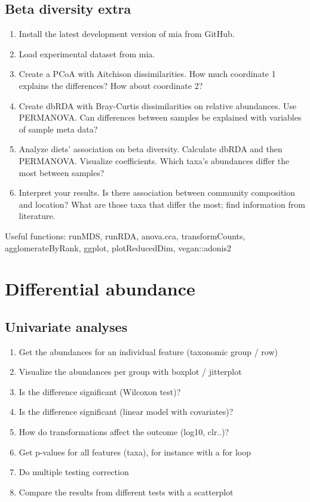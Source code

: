 \documentclass[
]{book}
\providecommand{\tightlist}{%
  \setlength{\itemsep}{0pt}\setlength{\parskip}{0pt}}
\begin{document}
\hypertarget{beta-diversity-extra}{%
\subsection{Beta diversity extra}\label{beta-diversity-extra}}

\begin{enumerate}
\def\labelenumi{\arabic{enumi}.}
\tightlist
\item
  Install the latest development version of mia from GitHub.
\item
  Load experimental dataset from mia.
\item
  Create a PCoA with Aitchison dissimilarities. How much coordinate 1 explains the differences? How about coordinate 2?
\item
  Create dbRDA with Bray-Curtis dissimilarities on relative abundances. Use PERMANOVA. Can differences between samples be explained with variables of sample meta data?
\item
  Analyze diets' association on beta diversity. Calculate dbRDA and then PERMANOVA. Visualize coefficients. Which taxa's abundances differ the most between samples?
\item
  Interpret your results. Is there association between community composition and location? What are those taxa that differ the most; find information from literature.
\end{enumerate}

Useful functions: runMDS, runRDA, anova.cca, transformCounts, agglomerateByRank, ggplot, plotReducedDim, vegan::adonis2

\hypertarget{differential-abundance-1}{%
\section{Differential abundance}\label{differential-abundance-1}}

\hypertarget{univariate-analyses}{%
\subsection{Univariate analyses}\label{univariate-analyses}}

\begin{enumerate}
\def\labelenumi{\arabic{enumi}.}
\tightlist
\item
  Get the abundances for an individual feature (taxonomic group / row)
\item
  Visualize the abundances per group with boxplot / jitterplot
\item
  Is the difference significant (Wilcoxon test)?
\item
  Is the difference significant (linear model with covariates)?
\item
  How do transformations affect the outcome (log10, clr..)?
\item
  Get p-values for all features (taxa), for instance with a for loop
\item
  Do multiple testing correction
\item
  Compare the results from different tests with a scatterplot
\end{enumerate}
\end{document}
